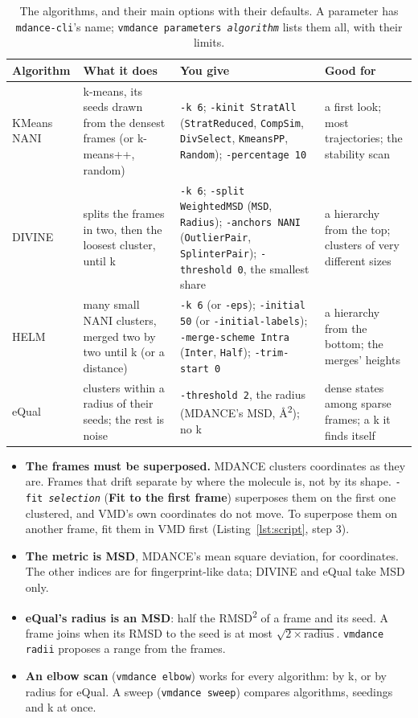 \documentclass[11pt,letterpaper]{article}
\newcommand{\ui}[1]{\textsf{\textbf{#1}}}
\newcommand{\cmd}[1]{\texttt{#1}}
\newcommand{\Asq}{\AA\textsuperscript{2}}
\newcommand{\meta}[1]{\textrm{\emph{#1}}}
\begin{document}
\begin{table}[H]
\centering
\small
\caption{The algorithms, and their main options with their defaults. A
  parameter has \cmd{mdance-cli}'s name; \cmd{vmdance parameters \meta{algorithm}} lists them all, with their limits.}
\label{tab:algorithms}
\begin{tabularx}{\textwidth}{@{}p{}LLp{0.22\textwidth}@{}}
\toprule
\textbf{Algorithm} & \textbf{What it does} & \textbf{You give} & \textbf{Good for} \\
\midrule
KMeans NANI & k-means, its seeds drawn from the densest frames (or
  k-means++, random) & \cmd{-k 6}; \cmd{-kinit StratAll} (\cmd{StratReduced},
  \cmd{CompSim}, \cmd{DivSelect}, \cmd{KmeansPP}, \cmd{Random});
  \cmd{-percentage 10} & a first look; most trajectories; the stability scan \\
\addlinespace
DIVINE & splits the frames in two, then the loosest cluster, until k &
  \cmd{-k 6}; \cmd{-split WeightedMSD} (\cmd{MSD}, \cmd{Radius});
  \cmd{-anchors NANI} (\cmd{OutlierPair}, \cmd{SplinterPair});
  \cmd{-threshold 0}, the smallest share & a hierarchy from the top; clusters
  of very different sizes \\
\addlinespace
HELM & many small NANI clusters, merged two by two until k (or a distance) &
  \cmd{-k 6} (or \cmd{-eps}); \cmd{-initial 50} (or \cmd{-initial-labels});
  \cmd{-merge-scheme Intra} (\cmd{Inter}, \cmd{Half}); \cmd{-trim-start 0} & a
  hierarchy from the bottom; the merges' heights \\
\addlinespace
eQual & clusters within a radius of their seeds; the rest is noise &
  \cmd{-threshold 2}, the radius (MDANCE's MSD, \Asq); no k & dense states
  among sparse frames; a k it finds itself \\
\bottomrule
\end{tabularx}
\end{table}

\begin{itemize}
  \item \textbf{The frames must be superposed.} MDANCE clusters coordinates as
    they are. Frames that drift separate by where the molecule is, not by its
    shape. \cmd{-fit \meta{selection}} (\ui{Fit to the first frame}) superposes
    them on the first one clustered, and VMD's own coordinates do not move. To
    superpose them on another frame, fit them in VMD first
    (Listing~\ref{lst:script}, step 3).
  \item \textbf{The metric is MSD}, MDANCE's mean square deviation, for
    coordinates. The other indices are for fingerprint-like data; DIVINE and
    eQual take MSD only.
  \item \textbf{eQual's radius is an MSD}: half the RMSD\textsuperscript{2} of a
    frame and its seed. A frame joins when its RMSD to the seed is at most
    $\sqrt{2 \times \text{radius}}$. \cmd{vmdance radii} proposes a range from
    the frames.
  \item \textbf{An elbow scan} (\cmd{vmdance elbow}) works for every algorithm:
    by k, or by radius for eQual. A sweep (\cmd{vmdance sweep}) compares
    algorithms, seedings and k at once.
\end{itemize}
\end{document}
